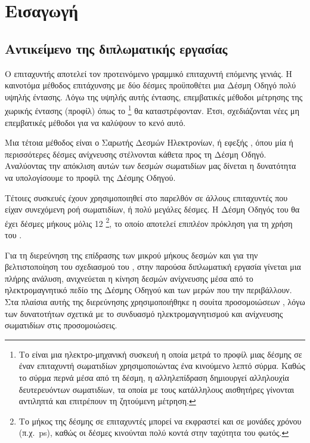 \chapter{Εισαγωγή}


\epigraph{\textit{}}{}

\section{Αντικείμενο της διπλωματικής εργασίας}
Ο επιταχυντής  αποτελεί τον προτεινόμενο γραμμικό επιταχυντή επόμενης γενιάς.
Η καινοτόμα μέθοδος επιτάχυνσης με δύο δέσμες προϋποθέτει μια Δέσμη Οδηγό πολύ υψηλής έντασης.
Λόγω της υψηλής αυτής έντασης, επεμβατικές μέθοδοι μέτρησης της χωρικής έντασης (προφίλ) όπως το \footnote{Το  είναι μια ηλεκτρο-μηχανική συσκευή η οποία μετρά το προφίλ μιας δέσμης σε έναν επιταχυντή σωματιδίων χρησιμοποιώντας ένα κινούμενο λεπτό σύρμα.
Καθώς το σύρμα περνά μέσα από τη δέσμη, η αλληλεπίδραση δημιουργεί αλληλουχία δευτερευόντων σωματιδίων, τα οποία με τους κατάλληλους αισθητήρες γίνονται αντιληπτά και επιτρέπουν τη ζητούμενη μέτρηση.} θα καταστρέφονταν.
Έτσι, σχεδιάζονται νέες μη επεμβατικές μέθοδοι για να καλύψουν το κενό αυτό.

Μια τέτοια μέθοδος είναι ο Σαρωτής Δεσμών Ηλεκτρονίων, ή εφεξής , όπου μία ή περισσότερες δέσμες ανίχνευσης στέλνονται κάθετα προς τη Δέσμη Οδηγό.
Αναλύοντας την απόκλιση αυτών των δεσμών σωματιδίων μας δίνεται η δυνατότητα να υπολογίσουμε το προφίλ της Δέσμης Οδηγού.

Τέτοιες συσκευές έχουν χρησιμοποιηθεί στο παρελθόν σε άλλους επιταχυντές που είχαν συνεχόμενη ροή σωματιδίων, ή πολύ μεγάλες δέσμες.
Η Δέσμη Οδηγός του  θα έχει δέσμες μήκους μόλις 12 \footnote{Το μήκος της δέσμης σε επιταχυντές μπορεί να εκφραστεί και σε μονάδες χρόνου (π.χ.\ \si{\pico \second}), καθώς οι δέσμες κινούνται πολύ κοντά στην ταχύτητα του φωτός.}, το οποίο αποτελεί επιπλέον πρόκληση για τη χρήση του .

Για τη διερεύνηση της επίδρασης των μικρού μήκους δεσμών και για την βελτιστοποίηση του σχεδιασμού του , στην παρούσα διπλωματική εργασία γίνεται μια πλήρης ανάλυση,  ανιχνεύεται η κίνηση δεσμών ανίχνευσης μέσα από το ηλεκτρομαγνητικό πεδίο της Δέσμης Οδηγού και των μερών που την περιβάλλουν. 
Στα πλαίσια αυτής της διερεύνησης χρησιμοποιήθηκε η σουίτα προσομοιώσεων , λόγω των δυνατοτήτων σχετικά με το συνδυασμό ηλεκτρομαγνητισμού και ανίχνευσης σωματιδίων στις προσομοιώσεις.

